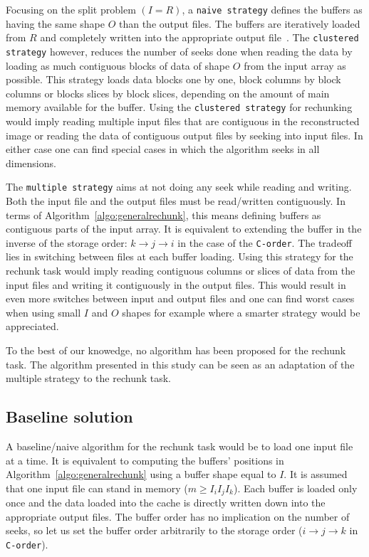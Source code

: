 \documentclass[conference]{IEEEtran}
\begin{document}
Focusing on the split problem $(I=R)$, a \texttt{naive strategy} defines the buffers as
having the same shape $O$ than the output files. The buffers are iteratively
loaded from $R$ and completely written into the appropriate output
file~\cite{seqalgorithms}. The \texttt{clustered strategy} however, reduces the number of
seeks done when reading the data by loading as much contiguous blocks of data
of shape $O$ from the input array as possible.
This strategy loads data blocks one by one, block columns by block columns or
blocks slices by block slices, depending on the amount of main memory available
for the buffer. Using the \texttt{clustered strategy} for rechunking would imply reading multiple
input files that are contiguous in the reconstructed image or reading the data
of contiguous output files by seeking into input files. In either case one can
find special cases in which the algorithm seeks in all dimensions.

The \texttt{multiple strategy} aims at not doing any seek while reading and writing.
Both the input file and the output files must be read/written contiguously. In
terms of Algorithm~\ref{algo:generalrechunk}, this means defining buffers as
contiguous parts of the input array. It is equivalent to extending the buffer
in the inverse of the storage order: $k \rightarrow j \rightarrow i$ in the case
of the \texttt{C-order}. The tradeoff lies in switching between files
at each buffer loading. Using this strategy for the rechunk task would imply
reading contiguous columns or slices of data from the input files and writing it
contiguously in the output files. This would result in even more switches
between input and output files and one can find worst cases when using small
$I$ and $O$ shapes for example where a smarter strategy would be appreciated.

To the best of our knowedge, no algorithm has been proposed for the
rechunk task. The algorithm presented in this study can be seen as an
adaptation of the multiple strategy to the rechunk task.

\subsection{Baseline solution}

A baseline/naive algorithm for the rechunk task would be to load one input file
at a time. It is equivalent to computing the buffers' positions in
Algorithm~\ref{algo:generalrechunk} using a buffer shape equal to $I$.
It is assumed that one input file can stand in memory ($m \geq I_iI_jI_k$). Each
buffer is loaded only once and the data loaded into the cache is directly
written down into the appropriate output files. The buffer order has no
implication on the number of seeks, so let us set the buffer order arbitrarily
to the storage order ($i \rightarrow j \rightarrow k$ in \texttt{C-order}).
\end{document}
